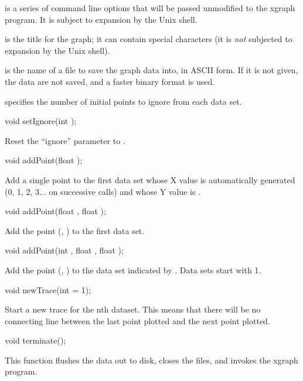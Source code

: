  is a series of command line options that will be passed
unmodified to the xgraph program.  It is subject to expansion by the
Unix shell.

 is the title for the graph; it can contain special
characters (it is \emph{not} subjected to expansion by the Unix shell).

 is the name of a file to save the graph data into, in
ASCII form.  If it is not given, the data are not saved, and a faster
binary format is used.

 specifies the number of initial points to ignore from
each data set.

\begin{example}
void setIgnore(int );
\end{example}

Reset the ``ignore'' parameter to .

\begin{example}
void addPoint(float );
\end{example}

Add a single point to the first data set whose X value is
automatically generated (0, 1, 2, 3... on successive calls)
and whose Y value is .

\begin{example}
void addPoint(float , float );
\end{example}

Add the point (, ) to the first data set.

\begin{example}
void addPoint(int , float , float );
\end{example}

Add the point (, ) to the data set indicated by
.  Data sets start with 1.

\begin{example}
void newTrace(int  = 1);
\end{example}

Start a new trace for the nth dataset.  This means that there will be
no connecting line between the last point plotted and the next point
plotted.

\begin{example}
void terminate();
\end{example}

This function flushes the data out to disk, closes the files, and
invokes the xgraph program.

